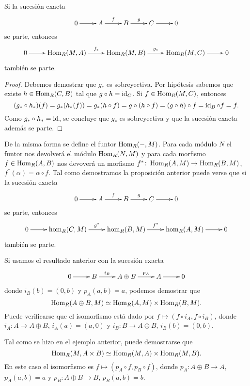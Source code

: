 \begin{proposition}
	Si la sucesión exacta
		\[
	\xymatrix{
	 0\ar[r] 
	 & A
	 \ar[r]^-{f}
	 & B
	 \ar[r]^-{g}
	 & C\ar[r]
	 & 0
	 }
	\]
	se parte, entonces 
	 \[
	\xymatrix{
	 0\ar[r] 
	 & \Hom_R(M,A)
	 \ar[r]^-{f_*}
	 & \Hom_R(M,B)
	 \ar[r]^-{g_*}
	 & \Hom_R(M,C)\ar[r]
	 & 0
	 }
	\]
	también se parte.
\end{proposition}

\begin{proof}
Debemos demostrar que $g_*$ es sobreyectiva. Por hipótesis sabemos que existe $h\in\operatorname{Hom}_R(C,B)$ tal que
$g\circ h=\operatorname{id}_C$. 
Si $f\in\operatorname{Hom}_R(M,C)$, entonces
\[
(g_*\circ h_*)(f)=g_*(h_*(f))=g_*(h\circ f)=g\circ (h\circ f)=(g\circ h)\circ f=\operatorname{id}_B\circ f=f.
\]
Como $g_*\circ h_*=\operatorname{id}$, se concluye que $g_*$ es sobreyectiva y que la sucesión exacta además se parte. 
\end{proof}

De la misma forma se define el funtor $\operatorname{Hom}_R(-,M)$. 
Para cada 
módulo $N$ el funtor nos devolverá el módulo $\operatorname{Hom}_R(N,M)$ y para cada
morfismo $f\in\operatorname{Hom}_R(A,B)$ nos devoverá un morfismo $f^*\colon\operatorname{Hom}_R(A,M)\to\operatorname{Hom}_R(B,M)$, 
$f^*(\alpha)=\alpha\circ f$. Tal como demostramos la proposición anterior
puede verse que
si la sucesión exacta
		\[
	\xymatrix{
	 0\ar[r] 
	 & A
	 \ar[r]^-{f}
	 & B
	 \ar[r]^-{g}
	 & C\ar[r]
	 & 0
	 }
	\]
	se parte, entonces 
	 \[
	\xymatrix{
	 0\ar[r] 
	 & \hom_R(C,M)
	 \ar[r]^-{g^*}
	 & \hom_R(B,M)
	 \ar[r]^-{f^*}
	 & \hom_R(A,M)\ar[r]
	 & 0
	 }
	\]
también se parte. 

\begin{example}
Si usamos el resultado anterior
con la sucesión exacta
\[
	\xymatrix{
	 0\ar[r] 
	 & B
	 \ar[r]^-{i_B}
	 & A\oplus B
	 \ar[r]^-{p_A}
	 & A\ar[r]
	 & 0
	 }
	\]
donde $i_B(b)=(0,b)$ y $p_A(a,b)=a$,  
podemos demostrar que  
\begin{equation}
\label{eq:hom1}
\operatorname{Hom}_R(A\oplus B,M)\simeq \operatorname{Hom}_R(A,M)\times\operatorname{Hom}_R(B,M).
\end{equation}
Puede verificarse que el isomorfismo está dado por $f\mapsto (f\circ i_A,f\circ i_B)$, 
donde $i_A\colon A\to A\oplus B$, $i_A(a)=(a,0)$ y 
$i_B\colon B\to A\oplus B$, $i_B(b)=(0,b)$.
\end{example}

\begin{example}
Tal como se hizo en el ejemplo anterior, puede demostrarse que 
\begin{equation}
\label{eq:hom2}	
\operatorname{Hom}_R(M,A\times B)\simeq \operatorname{Hom}_R(M,A)\times\operatorname{Hom}_R(M,B).	
\end{equation}
En este caso el isomorfismo es $f\mapsto (p_A\circ f,p_B\circ f)$, 
donde $p_A\colon A\oplus B\to A$, $p_A(a,b)=a$ y  
$p_B\colon A\oplus B\to B$, $p_B(a,b)=b$. 
\end{example}

